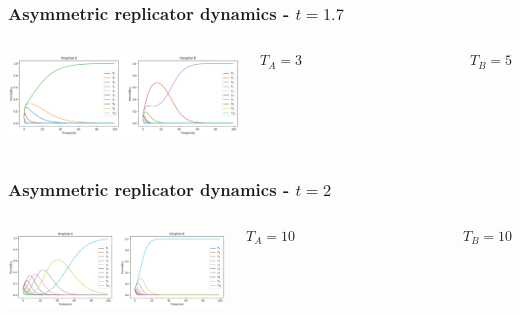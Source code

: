 \begin{frame}
    \frametitle{Asymmetric replicator dynamics - \(t = 1.7\)}

    \begin{columns}
        \centering
        \column{\dimexpr\paperwidth-10pt}
        \includegraphics[width=\textwidth]{Bin/replicator_dynamics/ard_t_1.7.png}

        \[T_A = 3  \qquad \qquad \qquad \qquad \qquad \qquad T_B = 5\]
    \end{columns}
    
\end{frame}


\begin{frame}
    \frametitle{Asymmetric replicator dynamics - \(t = 2\)}

    \begin{columns}
        \centering
        \column{\dimexpr\paperwidth-10pt}
        \includegraphics[width=\textwidth]{Bin/replicator_dynamics/ard_t_2.png}

        \[ T_A = 10  \qquad \qquad \qquad \qquad \qquad \qquad T_B = 10\]
    \end{columns}
    
\end{frame}

